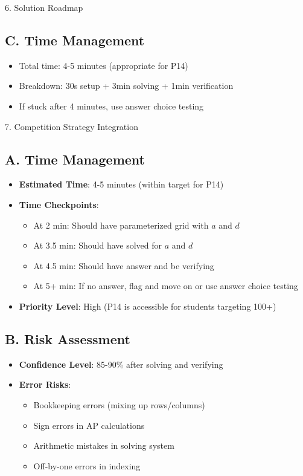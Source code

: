 \documentclass[12pt]{article}
\begin{document}
\begin{roadmapbox}{6. Solution Roadmap}
\subsection*{C. Time Management}
\begin{itemize}[leftmargin=*]
    \item Total time: 4-5 minutes (appropriate for P14)
    \item Breakdown: 30s setup + 3min solving + 1min verification
    \item If stuck after 4 minutes, use answer choice testing
\end{itemize}

\end{roadmapbox}

\begin{competitionbox}{7. Competition Strategy Integration}

\subsection*{A. Time Management}
\begin{itemize}[leftmargin=*]
    \item \textbf{Estimated Time}: 4-5 minutes (within target for P14)
    \item \textbf{Time Checkpoints}:
    \begin{itemize}
        \item At 2 min: Should have parameterized grid with $a$ and $d$
        \item At 3.5 min: Should have solved for $a$ and $d$
        \item At 4.5 min: Should have answer and be verifying
        \item At 5+ min: If no answer, flag and move on or use answer choice testing
    \end{itemize}
    \item \textbf{Priority Level}: High (P14 is accessible for students targeting 100+)
\end{itemize}

\subsection*{B. Risk Assessment}
\begin{itemize}[leftmargin=*]
    \item \textbf{Confidence Level}: 85-90\% after solving and verifying
    
    \item \textbf{Error Risks}: 
    \begin{itemize}
        \item Bookkeeping errors (mixing up rows/columns)
        \item Sign errors in AP calculations
        \item Arithmetic mistakes in solving system
        \item Off-by-one errors in indexing
    \end{itemize}
    

\end{itemize}
\end{competitionbox}
\end{document}
